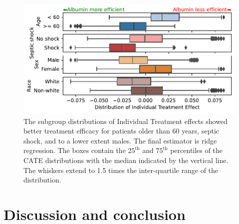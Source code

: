 \documentclass[french,12pt,twoside,a4paper]{book}
\begin{document}
\begin{figure}[!h]
  \begin{minipage}{.3\linewidth}
    \caption{The subgroup distributions of Individual Treatment effects showed
      better treatment efficacy for patients older than 60 years, septic shock,
      and to a lower extent males. The final estimator is ridge regression. The
      boxes contain the $25^\text{th}$ and $75^\text{th}$ percentiles of the CATE
      distributions with the median indicated by the vertical line. The whiskers
      extend to 1.5 times the inter-quartile range of the
      distribution.}\label{fig:albumin_for_sepsis:cate_results} \end{minipage}%
  \hfill%
  \begin{minipage}{.67\linewidth}
    \includegraphics[width=\linewidth]{img/chapter_4/boxplot_est__DML__nuisances__Forests__final_Ridge.pdf}
  \end{minipage}%
\end{figure}

\section{Discussion and conclusion}\label{subsec:causal_tuto:discussion}
\end{document}
